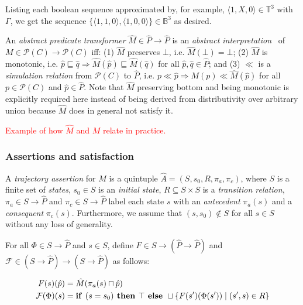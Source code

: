 \noindent Listing each boolean sequence approximated by, for example, $\langle 1,X,0  \rangle \in \mathbb{T}^{3}$ with $\Gamma$, we get the sequence $\{ \langle 1,1,0 \rangle, \langle 1,0,0 \rangle \} \in \mathbb{B}^{3}$ as desired.


An \textit{abstract predicate transformer} $\hat M \in \hat P \rightarrow \hat P$ is an \textit{abstract interpretation}~\cite{cousot1996} of $M \in \mathcal{P}(C) \rightarrow \mathcal{P}(C)$ iff: (1) $\hat M$ preserves $\bot$, i.e. $\hat M(\bot) = \bot$; (2) $\hat M$ is monotonic, i.e. $\hat p \sqsubseteq \hat q \Rightarrow \hat M (\hat p) \sqsubseteq \hat M (\hat q)$ for all $\hat p, \hat q \in \hat P$; and (3) $\ll$ is a \textit{simulation relation} from $\mathcal{P}(C)$ to $\hat P$, i.e. $p \ll \hat p \Rightarrow M (p) \ll \hat M (\hat p)$ for all $p \in \mathcal{P}(C)$ and $\hat p \in \hat P$. Note that $\hat M$ preserving bottom and being monotonic is explicitly required here instead of being derived from distributivity over arbitrary union because $\hat M$ does in general not satisfy it.


\textcolor{red}{Example of how $\hat M$ and $M$ relate in practice.}

\subsubsection{Assertions and satisfaction}

A \textit{trajectory assertion} for $\hat M$ is a quintuple $\hat A = (S,s_{0},R,\pi_{a},\pi_{c})$, where $S$ is a finite set of \textit{states}, $s_{0} \in S$ is an \textit{initial state}, $R \subseteq S \times S$ is a \textit{transition relation}, $\pi_{a} \in S \rightarrow \hat P$ and $\pi_{c} \in S \rightarrow \hat P$ label each state $s$ with an \textit{antecedent} $\pi_{a}(s)$ and a \textit{consequent} $\pi_{c}(s)$. Furthermore, we assume that $(s,s_{0}) \notin S$ for all $s \in S$ without any loss of generality.

For all $\Phi \in S \rightarrow \hat P$ and $s \in S$, define $F \in S \rightarrow (\hat P \rightarrow \hat P)$ and $\mathcal{F} \in (S \rightarrow \hat P) \rightarrow (S \rightarrow \hat P)$ as follows:

\begin{align}
F(s)(\hat p) &= \hat M(\pi_{a}(s) \sqcap \hat p) \\
\mathcal{F}(\Phi)(s) &= \textrm{\textbf{if }} (s = s_{0}) \textrm{\textbf{ then }} \top \textrm{\textbf{ else }} \sqcup \{ F(s')(\Phi(s')) \mid (s',s) \in R \}
\end{align}

